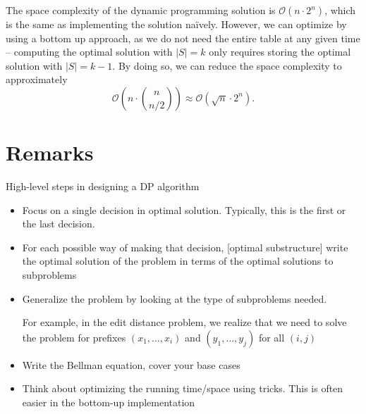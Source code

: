 The space complexity of the dynamic programming solution is $\mathcal{O}(n \cdot 2^n)$, which is the same as implementing the solution na\"ively. However, we can optimize by using a bottom up approach, as we do not need the entire table at any given time -- computing the optimal solution with $|S| = k$ only requires storing the optimal solution with $|S| = k - 1$. By doing so, we can reduce the space complexity to approximately \[
    \mathcal{O} \left( n \cdot \binom{n}{n/2} \right) \approx \mathcal{O} \left( \sqrt{n} \cdot 2^n \right).
\]

\section{Remarks}

High-level steps in designing a DP algorithm
\begin{itemize}
    \item Focus on a single decision in optimal solution. Typically, this is the first or the last decision. 

    \item For each possible way of making that decision, [optimal substructure] write the optimal solution of the problem in terms of the optimal solutions to subproblems

    \item Generalize the problem by looking at the type of subproblems needed. 
    
    For example, in the edit distance problem, we realize that we need to solve the problem for prefixes $(x_1, \dots, x_i)$ and $(y_1, \dots , y_j)$ for all $(i,j)$

    \item Write the Bellman equation, cover your base cases 

    \item Think about optimizing the running time/space using tricks. This is often easier in the bottom-up implementation
\end{itemize}